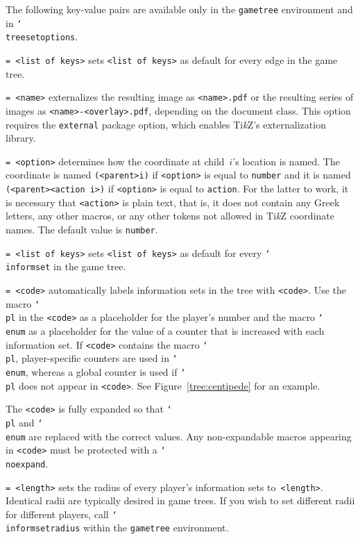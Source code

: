 \documentclass{article}
\newenvironment{desc}{\itemize[leftmargin=50pt]}{\enditemize}
\def\option#1#2{\item[\texttt{#1}] \hskip-1.5pt\texttt{#2}}
\renewcommand{\textbackslash}{\char`\\}
\def\cmd#1{\texttt{\color{cmd}\textbackslash#1}}
\def\TikZ{Ti\emph{k}Z\xspace}
\begin{document}
\noindent The following key-value pairs are available only in the \texttt{gametree} environment and in \cmd{treesetoptions}.%

\begin{desc}
\option{edge}{= <list of keys>} sets \texttt{<list of keys>} as default for every edge in the game tree.

\option{external}{= <name>} externalizes the resulting image as \texttt{<name>.pdf} or the resulting series of images as \texttt{<name>-<overlay>.pdf}, depending on the document class. This option requires the \texttt{external} package option, which enables \TikZ's externalization library.

\option{index}{= <option>} determines how the coordinate at child~$i$'s location is named. The coordinate is named \texttt{(<parent>i)} if \texttt{<option>} is equal to \texttt{number} and it is named \texttt{(<parent><action i>)} if \texttt{<option>} is equal to \texttt{action}. For the latter to work, it is necessary that \texttt{<action>} is plain text, that is, it does not contain any Greek letters, any other macros, or any other tokens not allowed in \TikZ coordinate names. The default value is \texttt{number}.

\option{inform}{= <list of keys>} sets \texttt{<list of keys>} as default for every \cmd{informset} in the game tree.

\option{inform autolabel}{= <code>} automatically labels information sets in the tree with \texttt{<code>}. Use the macro \cmd{pl} in the \texttt{<code>} as a placeholder for the player's number and the macro \cmd{enum} as a placeholder for the value of a counter that is increased with each information set. If \texttt{<code>} contains the macro \cmd{pl}, player-specific counters are used in \cmd{enum}, whereas a global counter is used if \cmd{pl} does not appear in \texttt{<code>}. See Figure~\ref{tree:centipede} for an example.

{\color{player4}The \texttt{<code>} is fully expanded so that \cmd{pl} and \cmd{enum} are replaced with the correct values. Any non-expandable macros appearing in \texttt{<code>} must be protected with a \cmd{noexpand}.}

\option{inform radius}{= <length>} sets the radius of every player's information sets to~\texttt{<length>}. Identical radii are typically desired in game trees. If you wish to set different radii for different players, call \cmd{informsetradius} within the \texttt{gametree} environment.


\end{desc}
\end{document}
